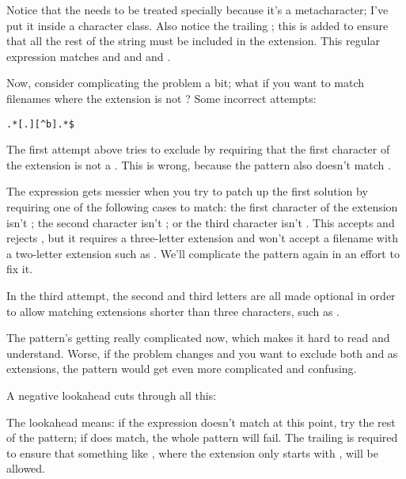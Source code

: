 \documentclass{howto}
\begin{document}

Notice that the  needs to be treated specially because it's a
metacharacter; I've put it inside a character class.  Also notice the
trailing \regexp{\$}; this is added to ensure that all the rest of the
string must be included in the extension.  This regular expression
matches  and  and  and
.

Now, consider complicating the problem a bit; what if you want to
match filenames where the extension is not ?
Some incorrect attempts:

\verb|.*[.][^b].*$|

The first attempt above tries to exclude  by requiring that
the first character of the extension is not a .  This is
wrong, because the pattern also doesn't match .


The expression gets messier when you try to patch up the first
solution by requiring one of the following cases to match: the first
character of the extension isn't ; the second character isn't
; or the third character isn't .  This accepts
 and rejects , but it requires a
three-letter extension and won't accept a filename with a two-letter
extension such as .  We'll complicate the pattern
again in an effort to fix it.


In the third attempt, the second and third letters are all made
optional in order to allow matching extensions shorter than three
characters, such as .

The pattern's getting really complicated now, which makes it hard to
read and understand.  Worse, if the problem changes and you want to
exclude both  and  as extensions, the pattern
would get even more complicated and confusing.

A negative lookahead cuts through all this:


The lookahead means: if the expression  doesn't match at
this point, try the rest of the pattern; if  does match,
the whole pattern will fail.  The trailing \regexp{\$} is required to
ensure that something like , where the extension
only starts with , will be allowed.
\end{document}
